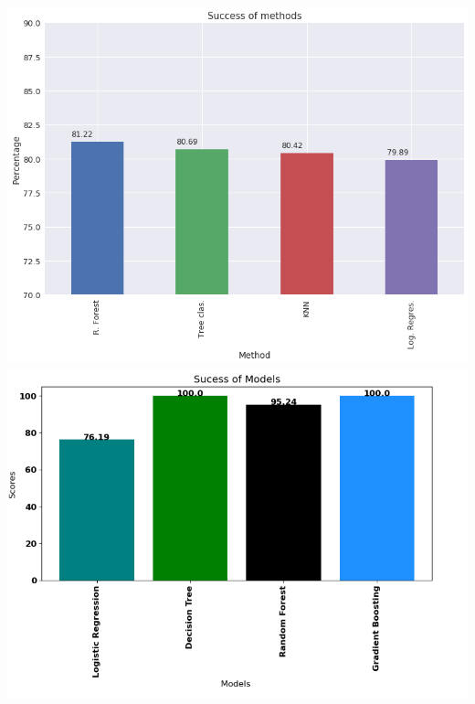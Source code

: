 \documentclass[a0,landscape]{a0poster}
\begin{document}
\begin{multicols}{4}
\begin{center}\vspace{1cm}
\includegraphics[width=0.7\linewidth]{figures/Dataset1.png}
\includegraphics[width=0.7\linewidth]{figures/Dataset_2.png}
\end{center}\vspace{1cm}








\end{multicols}
\end{document}
